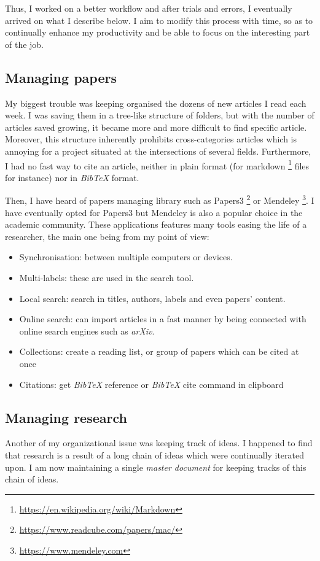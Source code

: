 \documentclass[twoside,10pt,openany,a4paper]{rapport}
\begin{document}
Thus, I worked on a better workflow and after trials and errors, I eventually arrived on what I describe below.
I aim to modify this process with time, so as to continually enhance my productivity and be able to focus on the interesting part of the job.

\subsection{Managing papers}
My biggest trouble was keeping organised the dozens of new articles I read each week.
I was saving them in a tree-like structure of folders, but with the number of articles saved growing, it became more and more difficult to find specific article.
Moreover, this structure inherently prohibits cross-categories articles which is annoying for a project situated at the intersections of several fields.
Furthermore, I had no fast way to cite an article, neither in plain format (for markdown \footnote{\url{https://en.wikipedia.org/wiki/Markdown}} files for instance) nor in \emph{BibTeX} format.

Then, I have heard of papers managing library such as Papers3 \footnote{\url{https://www.readcube.com/papers/mac/}} or Mendeley \footnote{\url{https://www.mendeley.com}}.
I have eventually opted for Papers3 but Mendeley is also a popular choice in the academic community.
These applications features many tools easing the life of a researcher, the main one being from my point of view:

\begin{itemize}
\item Synchronisation: between multiple computers or devices.
\item Multi-labels: these are used in the search tool.
\item Local search: search in titles, authors, labels and even papers' content.
\item Online search: can import articles in a fast manner by being connected with online search engines such as \emph{arXiv}.
\item Collections: create a reading list, or group of papers which can be cited at once
\item Citations: get \emph{BibTeX} reference or \emph{BibTeX} cite command in clipboard
\end{itemize}

\subsection{Managing research}
Another of my organizational issue was keeping track of ideas.
I happened to find that research is a result of a long chain of ideas which were continually iterated upon.
I am now maintaining a single \textit{master document} for keeping tracks of this chain of ideas.
\end{document}
